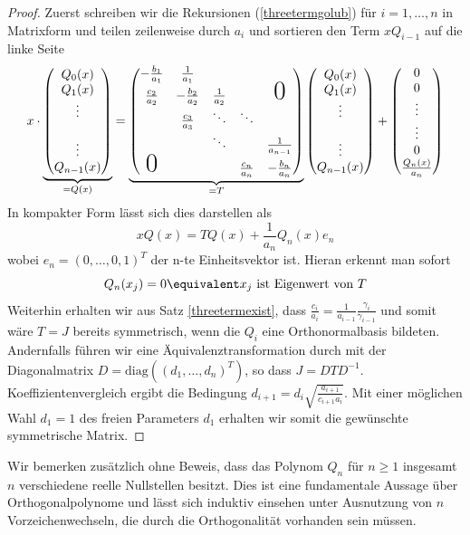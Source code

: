 \begin{proof}
Zuerst schreiben wir die Rekursionen (\ref{threetermgolub}) für $i=1,\dots,n$ in Matrixform und teilen zeilenweise durch $a_i$ und sortieren den Term $xQ_{i-1}$ auf die linke Seite
\begin{equation*}
x\cdot
\underbrace{\begin{pmatrix}Q_0(x)\\ Q_1(x) \\ \vdots \\ \\ \vdots \\ Q_{n-1}(x)\end{pmatrix}}_{=Q(x)}
=\underbrace{\begin{pmatrix}
-\frac{b_1}{a_1} & \frac{1}{a_1} &  &  &  \\ 
\frac{c_2}{a_2} & -\frac{b_2}{a_2} & \frac{1}{a_2} & & \text{\huge0} \\ 
 & \frac{c_3}{a_3} & \ddots & \ddots &  \\ 
 &  & \ddots & & \frac{1}{a_{n-1}} \\
\text{\huge0} &  &  & \frac{c_n}{a_n} & -\frac{b_n}{a_n}
\end{pmatrix}}_{=T}
\begin{pmatrix}Q_0(x)\\ Q_1(x) \\ \vdots \\ \\ \vdots \\ Q_{n-1}(x)\end{pmatrix} 
+\begin{pmatrix}0 \\ 0 \\ \vdots \\ \vdots \\ 0 \\ \frac{Q_{n}(x)}{a_n}\end{pmatrix} 
\end{equation*}
In kompakter Form lässt sich dies darstellen als
\[xQ(x)=TQ(x)+\frac{1}{a_n}Q_n(x)e_n\]
wobei $e_n=(0,\dots,0,1)^T$ der n-te Einheitsvektor ist. Hieran erkennt man sofort \[Q_n(x_j)=0\equivalent x_j\text{ ist Eigenwert von }T\]
Weiterhin erhalten wir aus Satz \ref{threetermexist}, dass $\frac{c_i}{a_i}=\frac{1}{a_{i-1}}\frac{\gamma_i}{\gamma_{i-1}}$ und somit wäre $T=J$ bereits symmetrisch, wenn die $Q_i$ eine Orthonormalbasis bildeten.\\
Andernfalls führen wir eine Äquivalenztransformation durch mit der Diagonalmatrix $D=\text{diag}\left((d_1,\dots,d_n)^T\right)$, so dass $J=DTD^{-1}$. Koeffizientenvergleich ergibt die Bedingung $d_{i+1}=d_i\sqrt{\frac{a_{i+1}}{c_{i+1}a_i}}$. Mit einer möglichen Wahl $d_1=1$ des freien Parameters $d_1$ erhalten wir somit die gewünschte symmetrische Matrix.
\end{proof}
Wir bemerken zusätzlich ohne Beweis, dass das Polynom $Q_n$ für $n\ge 1$ insgesamt $n$ verschiedene reelle Nullstellen besitzt. Dies ist eine fundamentale Aussage über Orthogonalpolynome und lässt sich induktiv einsehen unter Ausnutzung von $n$ Vorzeichenwechseln, die durch die Orthogonalität vorhanden sein müssen.

